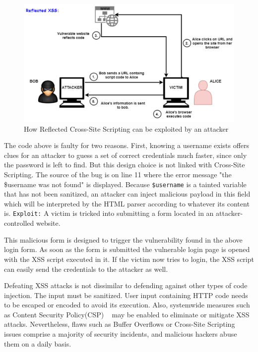 \begin{figure}[ht]
 \centering
 \captionsetup{justification=centering}
 \includegraphics[width=\linewidth]{figures/reflectedxss.pdf}
 \caption{How Reflected Cross-Site Scripting can be exploited by an attacker}
 \label{fig:reflectedxss}
\end{figure}


The code above is faulty for two reasons. First, knowing a username exists offers clues for an attacker to guess a set of correct credentials much faster, since only the password is left to find. But this design choice is not linked with Cross-Site Scripting. The source of the bug is on line 11 where the error message "the \$username was not found" is displayed. Because {\tt \$username} is a tainted variable that has not been sanitized, an attacker can inject malicious payload in this field which will be interpreted by the HTML parser according to whatever its content is. 
{\tt Exploit:} A victim is tricked into submitting a form located in an attacker-controlled website. 

This malicious form is designed to trigger the vulnerability found in the above login form. As soon as the form is submitted the vulnerable login page is opened with the XSS script executed in it. If the victim now tries to login, the XSS script can easily send the
credentials to the attacker as well. 

Defeating XSS attacks is not dissimilar to defending against other types of code injection.
The input must be sanitized. User input containing HTTP code needs to be escaped or encoded to avoid its execution. Also, systemwide measures such as Content Security Policy(CSP) ~\cite{csp_def} may be enabled to eliminate or mitigate XSS attacks. Nevertheless, flaws such as Buffer Overflows or Cross-Site Scripting issues comprise a majority of security incidents, and malicious hackers abuse them on a daily basis. 

